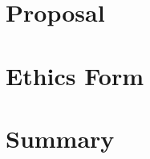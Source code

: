 \documentclass[10pt,a4paper]{report}
\begin{document}
\tableofcontents












\appendix

\chapter{Proposal}

\chapter{Ethics Form}

\chapter{Summary}

\end{document}
